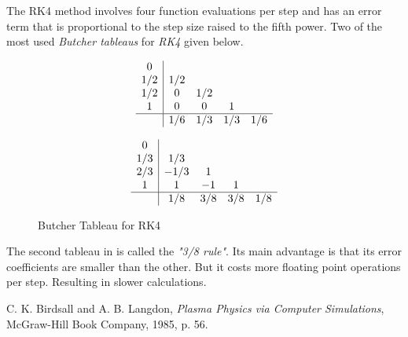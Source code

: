 \documentclass{article}
\begin{document}
The RK4 method involves four function evaluations per step and has an error term that is proportional to the step size raised to the fifth power.
Two of the most used \textit{Butcher tableaus} for \textit{RK4} given below.
\begin{figure}[h!]
    \centering
    \begin{subfigure}{.5\textwidth}
        \[ 
        \begin{array} 
            {c|cccc}
            0\\
            1/2 & 1/2 \\
            1/2 & 0 & 1/2 \\
            1   & 0 & 0 & 1\\
            \hline
            & 1/6 & 1/3 & 1/3 & 1/6
        \end{array}
        \]  
    \end{subfigure}%
    \begin{subfigure}{.5\textwidth}
        \[ 
        \begin{array} 
            {c|cccc}
            0\\
            1/3 & 1/3 \\
            2/3 & -1/3 & 1 \\
            1   & 1 & -1 & 1\\
            \hline
            & 1/8 & 3/8 & 3/8 & 1/8
        \end{array}
        \]  
    \end{subfigure}
    \caption{Butcher Tableau for RK4}
    \label{fig:Butcher-RK4}
\end{figure}
The second tableau in  is called the \textit{"3/8 rule"}. Its main advantage is that its error coefficients are smaller than the other. But it costs more floating point operations per step. 
Resulting in slower calculations. 




\begin{thebibliography}{9}
C. K. Birdsall and A. B. Langdon, \emph{Plasma Physics via Computer Simulations}, McGraw-Hill Book Company, 1985, p. 56.
\end{thebibliography}
\end{document}
